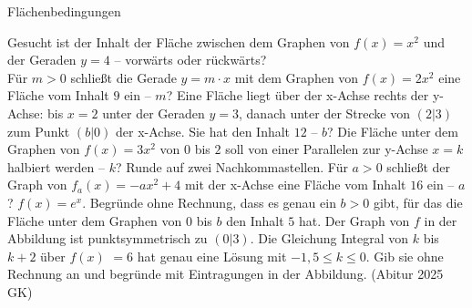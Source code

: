 \setcounter{aufgabe}{14}

\begin{aufgabe}{Flächenbedingungen}
\begin{teile}
\teil Gesucht ist der Inhalt der Fläche zwischen dem Graphen von $f(x) = x^2$ und der Geraden $y = 4$ – vorwärts oder rückwärts? \\ 
\teil Für $m > 0$ schließt die Gerade $y = m \cdot x$ mit dem Graphen von $f(x) = 2x^2$ eine Fläche vom Inhalt $9$ ein – $m$?
\teil Eine Fläche liegt über der x-Achse rechts der y-Achse: bis $x = 2$ unter der Geraden $y = 3$, danach unter der Strecke von $(2|3)$ zum Punkt $(b|0)$ der x-Achse. Sie hat den Inhalt $12$ – $b$?
\teil Die Fläche unter dem Graphen von $f(x) = 3x^2$ von $0$ bis $2$ soll von einer Parallelen zur y-Achse $x = k$ halbiert werden – $k$? Runde auf zwei Nachkommastellen.
\teil Für $a > 0$ schließt der Graph von $f_a(x) = -a x^2 + 4$ mit der x-Achse eine Fläche vom Inhalt $16$ ein – $a$?
\teil $f(x) = e^{x}$. Begründe ohne Rechnung, dass es genau ein $b > 0$ gibt, für das die Fläche unter dem Graphen von $0$ bis $b$ den Inhalt $5$ hat.
\teil Der Graph von $f$ in der Abbildung ist punktsymmetrisch zu $(0|3)$. Die Gleichung Integral von $k$ bis $k + 2$ über $f(x)$ $= 6$ hat genau eine Lösung mit $-1{,}5 \le k \le 0$. Gib sie ohne Rechnung an und begründe mit Eintragungen in der Abbildung. \hfill (Abitur 2025 GK)

\begin{ksys}[xmin=-3,xmax=3,ymin=-1,ymax=6,ablesen]\end{ksys}
\end{teile}
\end{aufgabe}


